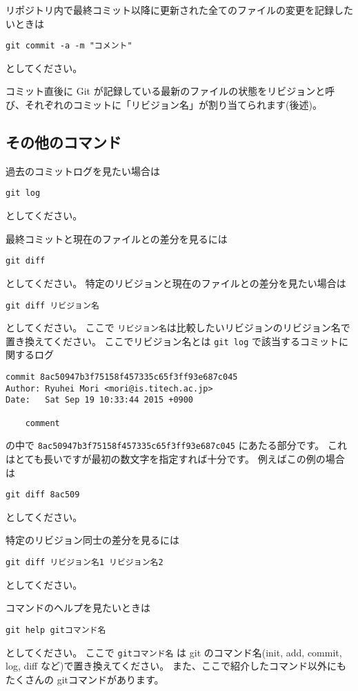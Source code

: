 \documentclass[a4paper,11pt, article]{memoir}
\begin{document}
リポジトリ内で最終コミット以降に更新された全てのファイルの変更を記録したいときは
\begin{verbatim}
git commit -a -m "コメント"
\end{verbatim}
としてください。

コミット直後に Git が記録している最新のファイルの状態をリビジョンと呼び、それぞれのコミットに「リビジョン名」が割り当てられます(後述)。


\subsection{その他のコマンド}
過去のコミットログを見たい場合は
\begin{verbatim}
git log
\end{verbatim}
としてください。

最終コミットと現在のファイルとの差分を見るには
\begin{verbatim}
git diff
\end{verbatim}
としてください。
特定のリビジョンと現在のファイルとの差分を見たい場合は
\begin{verbatim}
git diff リビジョン名
\end{verbatim}
としてください。
ここで \texttt{リビジョン名}は比較したいリビジョンのリビジョン名で置き換えてください。
ここでリビジョン名とは \texttt{git log} で該当するコミットに関するログ
\begin{verbatim}
commit 8ac50947b3f75158f457335c65f3ff93e687c045
Author: Ryuhei Mori <mori@is.titech.ac.jp>
Date:   Sat Sep 19 10:33:44 2015 +0900

    comment
\end{verbatim}
の中で \texttt{8ac50947b3f75158f457335c65f3ff93e687c045} にあたる部分です。
これはとても長いですが最初の数文字を指定すれば十分です。
例えばこの例の場合は
\begin{verbatim}
git diff 8ac509
\end{verbatim}
としてください。

特定のリビジョン同士の差分を見るには
\begin{verbatim}
git diff リビジョン名1 リビジョン名2
\end{verbatim}
としてください。

コマンドのヘルプを見たいときは
\begin{verbatim}
git help gitコマンド名
\end{verbatim}
としてください。
ここで \texttt{gitコマンド名} は git のコマンド名(init, add, commit, log, diff など)で置き換えてください。
また、ここで紹介したコマンド以外にもたくさんの gitコマンドがあります。
\end{document}
